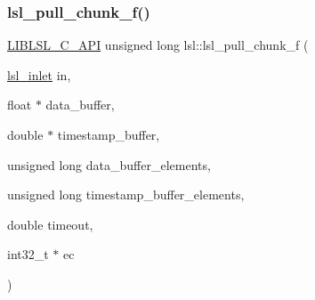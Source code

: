\mbox{\label{namespacelsl_a59b21970f29b294c8d4d43be06335cba}} 
\subsubsection{\texorpdfstring{lsl\+\_\+pull\+\_\+chunk\+\_\+f()}{lsl\_pull\_chunk\_f()}}
{\footnotesize\ttfamily \hyperlink{lsl__cpp_8h_aafd0ef1813e8be84a1420c4f1df64615}{L\+I\+B\+L\+S\+L\+\_\+\+C\+\_\+\+A\+PI} unsigned long lsl\+::lsl\+\_\+pull\+\_\+chunk\+\_\+f (\begin{DoxyParamCaption}\item[{\hyperlink{namespacelsl_a884a3363cfcba75d7ce8f00c1c4c54f1}{lsl\+\_\+inlet}}]{in,  }\item[{float $\ast$}]{data\+\_\+buffer,  }\item[{double $\ast$}]{timestamp\+\_\+buffer,  }\item[{unsigned long}]{data\+\_\+buffer\+\_\+elements,  }\item[{unsigned long}]{timestamp\+\_\+buffer\+\_\+elements,  }\item[{double}]{timeout,  }\item[{int32\+\_\+t $\ast$}]{ec }\end{DoxyParamCaption})}

